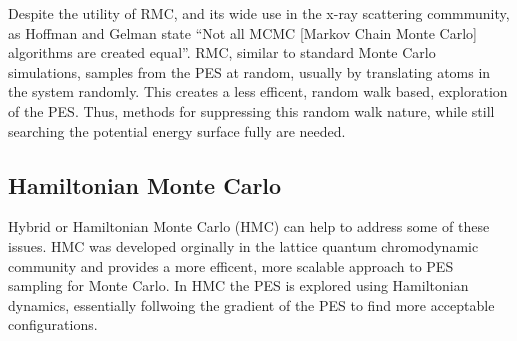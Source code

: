 Despite the utility of RMC, and its wide use in the x-ray scattering commmunity, as Hoffman and Gelman state ``Not all MCMC [Markov Chain Monte Carlo] algorithms are created equal''.\cite{Hoffman2014}
RMC, similar to standard Monte Carlo simulations, samples from the PES at random, usually by translating atoms in the system randomly.
This creates a less efficent, random walk based, exploration of the PES.\cite{Hoffman2014, Neal1993}
Thus, methods for suppressing this random walk nature, while still searching the potential energy surface fully are needed.

\subsection{Hamiltonian Monte Carlo}
Hybrid or Hamiltonian Monte Carlo (HMC) can help to address some of these issues.
HMC was developed orginally in the lattice quantum chromodynamic community and provides a more efficent, more scalable approach to PES sampling for Monte Carlo.\cite{Duane1987, Neal2011}
In HMC the PES is explored using Hamiltonian dynamics, essentially follwoing the gradient of the PES to find more acceptable configurations.


